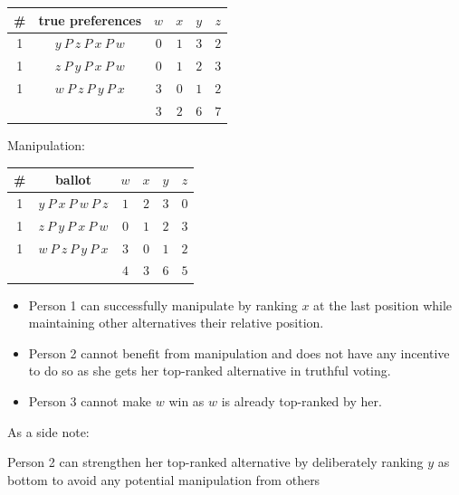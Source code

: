 \documentclass[a4paper]{article}
\begin{document}
\begin{table}[!htbp]
    \centering
    \begin{tabular}{c|c|cccc|}
        \# & true preferences             & $w$  & $x$  & $y$  & $z$ \\ 
        \hline
        1  & $y\: P\: z\: P\: x\: P\: w$  & $0$  & $1$  & $3$  & $2$ \\
        1  & $z\: P\: y\: P\: x\: P\: w$  & $0$  & $1$  & $2$  & $3$ \\
        1  & $w\: P\: z\: P\: y\: P\: x$  & $3$  & $0$  & $1$  & $2$ \\
        \hline
           &                              & $3$ & $2$  & $6$  & $7$ \\
        \hline
    \end{tabular}
\end{table}

Manipulation:
\begin{table}[!htbp]
    \centering
    \begin{tabular}{c|c|cccc|}
        \# & ballot                       & $w$  & $x$  & $y$  & $z$ \\ 
        \hline
        1  & $y\: P\: x\: P\: w\: P\: z$  & $1$  & $2$  & $3$  & $0$ \\
        1  & $z\: P\: y\: P\: x\: P\: w$  & $0$  & $1$  & $2$  & $3$ \\
        1  & $w\: P\: z\: P\: y\: P\: x$  & $3$  & $0$  & $1$  & $2$ \\
        \hline
           &                              & $4$ & $3$  & $6$  & $5$ \\
        \hline
    \end{tabular}
\end{table}

\begin{itemize}
    \item Person 1 can successfully manipulate by ranking $x$ at the last position while maintaining other alternatives their relative position.
    \item Person 2 cannot benefit from manipulation and does not have any incentive to do so as she gets her top-ranked alternative in truthful voting.
    \item Person 3 cannot make $w$ win as $w$ is already top-ranked by her.
\end{itemize}

As a side note:

Person 2 can strengthen her top-ranked alternative by deliberately ranking $y$ as bottom to avoid any potential manipulation from others
\end{document}
